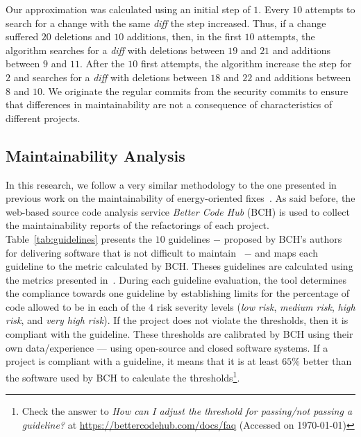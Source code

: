 \documentclass[10pt,conference]{IEEEtran}
\begin{document}
Our approximation was calculated using an initial step of $1$. Every $10$ attempts to search for 
a change with the same \emph{diff} the step increased. Thus, if a change suffered $20$ deletions 
and $10$ additions, then, in the first $10$ attempts, the algorithm searches for a \emph{diff} with 
deletions between $19$ and $21$ and additions between $9$ and $11$. After the $10$ first attempts, 
the algorithm increase the step for $2$ and searches for a \emph{diff} with deletions between $18$ and $22$ and additions between 
$8$ and $10$. We originate the regular commits from the security
commits to ensure that differences in maintainability are not a consequence of
characteristics of different projects.

\subsection{Maintainability Analysis}

In this research, we follow a very similar methodology to the one presented in previous work on the maintainability 
of energy-oriented fixes~\cite{cruz2019energyoriented}. As said before, the web-based source code analysis service \emph{Better Code
Hub} (BCH) is used to collect the maintainability reports of the refactorings of
each project. Table~\ref{tab:guidelines} presents the $10$ guidelines $-$ proposed
by BCH's authors for delivering software that is not difficult to
maintain~\cite{Visser:2016:OREILLY} $-$ and maps each guideline to the metric 
calculated by BCH. Theses guidelines are calculated using the metrics 
presented in~\cite{criteria:2017}. During each guideline evaluation, the tool
determines the compliance towards one guideline by establishing limits for the
percentage of code allowed to be in each of the $4$ risk severity levels
(\emph{low risk}, \emph{medium risk}, \emph{high risk}, and \emph{very high
risk}). If the project does not violate the thresholds, then it is compliant
with the guideline. These thresholds are calibrated by BCH using their own
data/experience --- using open-source and closed software systems. If a project is
compliant with a guideline, it means that it is at least $65\%$ better than the
software used by BCH to calculate the thresholds\footnote{Check the answer to
\emph{How can I adjust the threshold for passing/not passing a guideline?} at
\url{https://bettercodehub.com/docs/faq} (Accessed on \today{})}.
\end{document}
